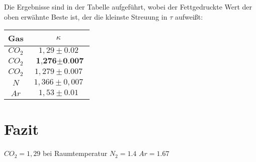 \documentclass[%
   final,      %
   paper=a4, paper=portrait, pagesize=auto, %
   fontsize=11pt, %
   ngerman, %
 ]{scrartcl} %
\begin{document}
Die Ergebnisse sind in der Tabelle aufgeführt, wobei der Fettgedruckte Wert der oben erwähnte Beste ist, der die kleinste Streuung in $\tau$ aufweißt:

\vspace{0,5 cm}
\begin{tabular}{|c|c|}
\hline 
Gas & $\kappa$ \\ 
\hline 
$CO_2$ & $1,29 \pm 0.02$ \\ 
\hline 
$CO_2$ &  $\textbf{ 1,276} \pm \textbf{0.007}$ \\ 
\hline 
$CO_2$ & $1,279 \pm 0.007$ \\ 
\hline 
$N$ & $1,366\pm 0,007$  \\ 
\hline
$Ar$ & $1,53\pm 0.01$ \\
\hline 
\end{tabular} 
\section{Fazit}
$CO_2 = 1,29$ bei Raumtemperatur
$N_2 = 1.4$
$Ar = 1.67$
\end{document}
